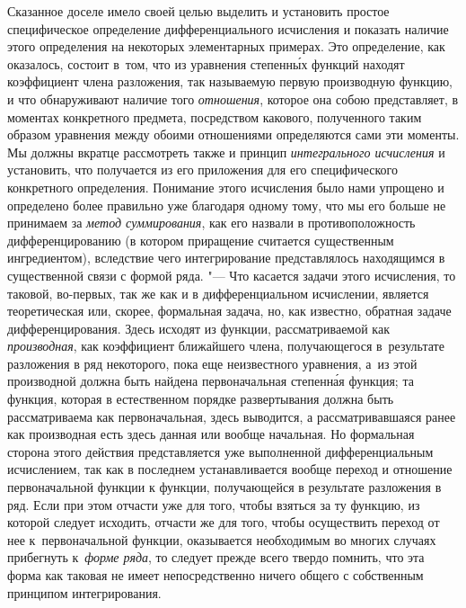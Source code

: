 Сказанное доселе имело своей целью выделить и установить простое специфическое
определение дифференциального исчисления и показать наличие этого определения
на некоторых элементарных примерах. Это определение, как оказалось, состоит
в~том, что из уравнения степенн\'{ы}х функций находят коэффициент члена разложения,
так называемую первую производную функцию, и что обнаруживают наличие того
{\em отношения}, которое она собою представляет, в моментах конкретного
предмета, посредством какового, полученного таким образом уравнения между
обоими отношениями определяются сами эти моменты. Мы должны вкратце рассмотреть
также и принцип {\em интегрального исчисления} и установить, что получается из
его приложения для его специфического конкретного определения. Понимание этого
исчисления было нами упрощено и определено более правильно уже благодаря одному
тому, что мы его больше не принимаем за {\em метод суммирования}, как его
назвали в противоположность дифференцированию (в котором приращение считается
существенным ингредиентом), вследствие чего интегрирование представлялось
находящимся в существенной связи с формой ряда. "--- Что касается задачи этого
исчисления, то таковой, во-первых, так же как и в дифференциальном исчислении,
является теоретическая или, скорее, формальная задача, но, как известно,
обратная задаче дифференцирования. Здесь исходят из функции, рассматриваемой
как {\em производная}, как коэффициент ближайшего члена, получающегося
в~результате разложения в ряд некоторого, пока еще неизвестного уравнения, а~из
этой производной должна быть найдена первоначальная степенн\'{а}я функция; та
функция, которая в естественном \label{bkm:bm53b}порядке развертывания должна
быть рассматриваема как первоначальная, здесь выводится, а рассматривавшаяся
ранее как производная есть здесь данная или вообще начальная. Но формальная
сторона этого действия представляется уже выполненной дифференциальным
исчислением, так как в последнем устанавливается вообще переход и отношение
первоначальной функции к функции, получающейся в результате разложения в ряд.
Если при этом отчасти уже для того, чтобы взяться за ту функцию, из которой
следует исходить, отчасти же для того, чтобы осуществить переход от нее
к~первоначальной функции, оказывается необходимым во многих случаях прибегнуть
к~{\em форме ряда}, то следует прежде всего твердо помнить, что эта форма как
таковая не имеет непосредственно ничего общего с собственным принципом
интегрирования.

